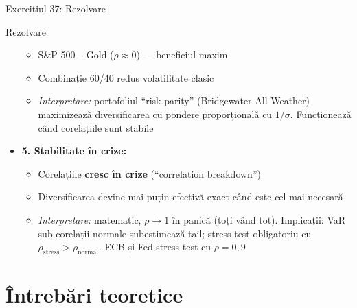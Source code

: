 \documentclass[9pt, aspectratio=169, t]{beamer}
\begin{document}
\begin{frame}[shrink=40]{Exercițiul 37: Rezolvare}
\begin{cminipage}{0.95\textwidth}
\begin{exampleblock}{Rezolvare}
\begin{itemize}
    \begin{itemize}\setlength{\itemsep}{0pt}
        \item S\&P 500 -- Gold ($\rho \approx 0$) --- beneficiul maxim
        \item Combinație 60/40 redus volatilitate clasic
        \item \textit{Interpretare:} portofoliul ``risk parity'' (Bridgewater All Weather) maximizează diversificarea cu pondere proporțională cu $1/\sigma$. Funcționează când corelațiile sunt stabile
    \end{itemize}
    \item \textbf{5. Stabilitate în crize:}
    \begin{itemize}\setlength{\itemsep}{0pt}
        \item Corelațiile \textbf{cresc în crize} (``correlation breakdown'')
        \item Diversificarea devine mai puțin efectivă exact când este cel mai necesară
        \item \textit{Interpretare:} matematic, $\rho \to 1$ în panică (toți vând tot). Implicații: VaR sub corelații normale subestimează tail; stress test obligatoriu cu $\rho_{\text{stress}} > \rho_{\text{normal}}$. ECB și Fed stress-test cu $\rho = 0{,}9$
    \end{itemize}
\end{itemize}
\end{exampleblock}
\end{cminipage}
\end{frame}

\section{Întrebări teoretice}
\end{document}
